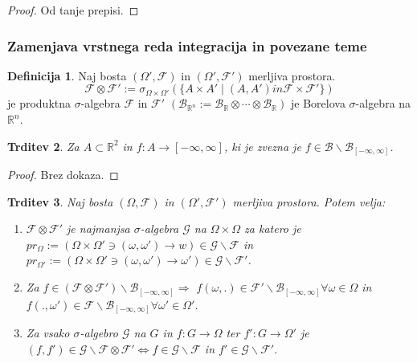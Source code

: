 \documentclass[a4paper,12pt]{article}
\theoremstyle{definition} %
\newtheorem{definicija}{Definicija}[section]
\theoremstyle{plain} %
\newtheorem{trditev}[definicija]{Trditev}
\newcommand{\R}{\mathbb{R}}
\newcommand{\F}{\mathcal{F}}
\begin{document}
            \begin{proof}
                Od tanje prepisi.
            \end{proof}

        \subsubsection{Zamenjava vrstnega reda integracija in povezane teme}
            
            \begin{definicija}
                Naj bosta $(\Omega', \F)$ in $(\Omega', \F')$ merljiva prostora. 
                $$
                    \F \otimes \F' := \sigma_{\Omega \times \Omega'}(\{A \times A' \mid (A, A') in \F \times \F'\})
                $$
                je produktna $\sigma$-algebra $\F$ in $\F'$ $(\mathcal{B}_{\R^n} := \mathcal{B}_{\R} \otimes \cdots \otimes \mathcal{B}_{\R})$ je Borelova
                $\sigma$-algebra na $\R^n$.
            \end{definicija}

            \begin{trditev}
                Za $A \subset \R^2$ in $f:A \rightarrow [-\infty, \infty]$, ki je zvezna je $f \in \mathcal{B}\backslash\mathcal{B}_{[-\infty, \infty]}$.
            \end{trditev}

            \begin{proof}
                Brez dokaza.
            \end{proof}

            \begin{trditev}
                Naj bosta $(\Omega, \F)$ in $(\Omega', \F')$ merljiva prostora. Potem velja:
                \begin{enumerate}
                    \item $\F \otimes \F' $ je najmanjsa $\sigma$-algebra $\mathcal{G}$ na $\Omega \times \Omega$ za katero je $pr_\Omega := (\Omega \times \Omega' \ni (\omega, \omega') \rightarrow w) \in \mathcal{G}\backslash\F$ in $pr_{\Omega'} := (\Omega \times \Omega' \ni (\omega, \omega') \rightarrow \omega') \in \mathcal{G}\backslash\F'$.
                    \item Za $f \in (\F \otimes \F')\backslash\mathcal{B}_{[-\infty, \infty]} \Rightarrow$ $f(\omega, .) \in \F'\backslash\mathcal{B}_{[-\infty, \infty]} \forall \omega \in \Omega$ in $f(., \omega') \in \F\backslash\mathcal{B}_{[-\infty, \infty]} \forall \omega' \in \Omega'$.
                    \item Za vsako $\sigma$-algebro $\mathcal{G}$ na $G$ in $f: G \rightarrow \Omega$ ter $f':G \rightarrow \Omega'$ je $(f, f') \in \mathcal{G}\backslash\F\otimes\F' \iff f \in \mathcal{G}\backslash\F$ in $f'\in \mathcal{G}\backslash\F'.$
                \end{enumerate}
            \end{trditev}
\end{document}
